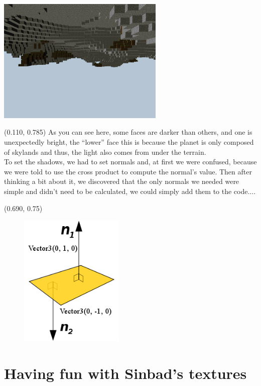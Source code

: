\documentclass[article]{report}             %
\begin{document}
				\begin{center}
					\includegraphics[width=8cm]{images/shadows.png} %
				\end{center}
					\begin{textblock}{0.575}(0.110, 0.785)
					As you can see here, some faces are darker than others, and one is unexpectedly bright, the ``lower'' face this is because the planet is only composed of skylands and thus, the light also comes from under the terrain.\\

					To set the shadows, we had to set normals and, at first we were confused, because we were told to use the cross product to compute the normal's value. Then after thinking a bit about it, we discovered that the only normals we needed were simple and didn't need to be calculated, we could simply add them to the code....
				\end{textblock}

				\begin{textblock}{0.628}(0.690, 0.75)
					\begin{figure}
					\includegraphics[width=5cm]{images/normal.png}
					\end{figure}
				\end{textblock}
\newpage
			\section{Having fun with Sinbad's textures}
\end{document}
